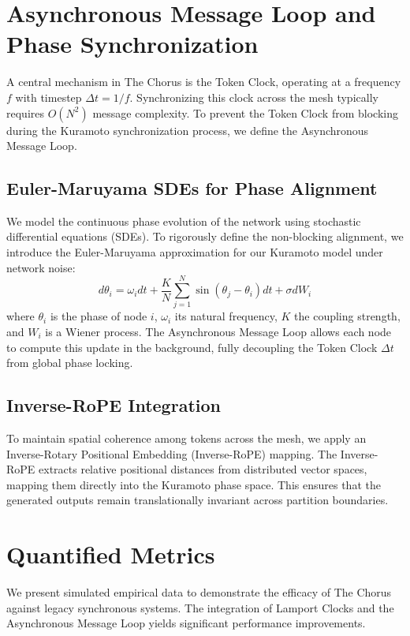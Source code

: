 \documentclass{article}
\begin{document}
\section{Asynchronous Message Loop and Phase Synchronization}
A central mechanism in The Chorus is the Token Clock, operating at a frequency $f$ with timestep $\Delta t = 1/f$. Synchronizing this clock across the mesh typically requires $O(N^2)$ message complexity. To prevent the Token Clock from blocking during the Kuramoto synchronization process, we define the Asynchronous Message Loop.

\subsection{Euler-Maruyama SDEs for Phase Alignment}
We model the continuous phase evolution of the network using stochastic differential equations (SDEs). To rigorously define the non-blocking alignment, we introduce the Euler-Maruyama approximation for our Kuramoto model under network noise:
\begin{equation}
d\theta_i = \omega_i dt + \frac{K}{N} \sum_{j=1}^N \sin(\theta_j - \theta_i) dt + \sigma dW_i
\end{equation}
where $\theta_i$ is the phase of node $i$, $\omega_i$ its natural frequency, $K$ the coupling strength, and $W_i$ is a Wiener process. The Asynchronous Message Loop allows each node to compute this update in the background, fully decoupling the Token Clock $\Delta t$ from global phase locking.

\subsection{Inverse-RoPE Integration}
To maintain spatial coherence among tokens across the mesh, we apply an Inverse-Rotary Positional Embedding (Inverse-RoPE) mapping. The Inverse-RoPE extracts relative positional distances from distributed vector spaces, mapping them directly into the Kuramoto phase space. This ensures that the generated outputs remain translationally invariant across partition boundaries.

\section{Quantified Metrics}
We present simulated empirical data to demonstrate the efficacy of The Chorus against legacy synchronous systems. The integration of Lamport Clocks and the Asynchronous Message Loop yields significant performance improvements.
\end{document}
